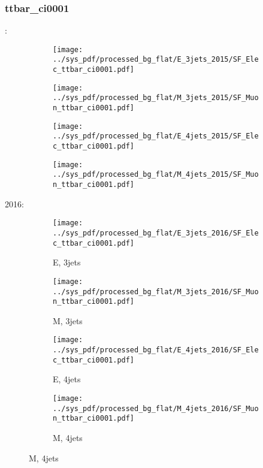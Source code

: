 \documentclass{beamer}
\begin{document}
\begin{frame}
\frametitle{ttbar_ci0001}
\fontsize{5}{1}:
\begin{figure}
\centering
\begin{subfigure}[b]{0.24\textwidth}
\texttt{[image: ../sys\_pdf/processed\_bg\_flat/E\_3jets\_2015/SF\_Elec\_ttbar\_ci0001.pdf]}
\end{subfigure}
\begin{subfigure}[b]{0.24\textwidth}
\texttt{[image: ../sys\_pdf/processed\_bg\_flat/M\_3jets\_2015/SF\_Muon\_ttbar\_ci0001.pdf]}
\end{subfigure}
\begin{subfigure}[b]{0.24\textwidth}
\texttt{[image: ../sys\_pdf/processed\_bg\_flat/E\_4jets\_2015/SF\_Elec\_ttbar\_ci0001.pdf]}
\end{subfigure}
\begin{subfigure}[b]{0.24\textwidth}
\texttt{[image: ../sys\_pdf/processed\_bg\_flat/M\_4jets\_2015/SF\_Muon\_ttbar\_ci0001.pdf]}
\end{subfigure}
\end{figure}
2016:
\begin{figure}
\centering
\begin{subfigure}[b]{0.24\textwidth}
\texttt{[image: ../sys\_pdf/processed\_bg\_flat/E\_3jets\_2016/SF\_Elec\_ttbar\_ci0001.pdf]}
\captionsetup{font=tiny}
\caption{E, 3jets}
\end{subfigure}
\begin{subfigure}[b]{0.24\textwidth}
\texttt{[image: ../sys\_pdf/processed\_bg\_flat/M\_3jets\_2016/SF\_Muon\_ttbar\_ci0001.pdf]}
\captionsetup{font=tiny}
\caption{M, 3jets}
\end{subfigure}
\begin{subfigure}[b]{0.24\textwidth}
\texttt{[image: ../sys\_pdf/processed\_bg\_flat/E\_4jets\_2016/SF\_Elec\_ttbar\_ci0001.pdf]}
\captionsetup{font=tiny}
\caption{E, 4jets}
\end{subfigure}
\begin{subfigure}[b]{0.24\textwidth}
\texttt{[image: ../sys\_pdf/processed\_bg\_flat/M\_4jets\_2016/SF\_Muon\_ttbar\_ci0001.pdf]}
\captionsetup{font=tiny}
\caption{M, 4jets}
\end{subfigure}
\end{figure}
\end{frame}
\end{document}
